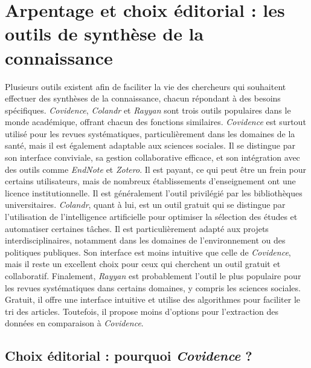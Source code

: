 \documentclass[
  letterpaper,
  DIV=11,
  numbers=noendperiod,
  oneside]{scrreprt}
\begin{document}
\hypertarget{arpentage-et-choix-uxe9ditorial-les-outils-de-synthuxe8se-de-la-connaissance}{%
\section{Arpentage et choix éditorial : les outils de synthèse de la
connaissance}\label{arpentage-et-choix-uxe9ditorial-les-outils-de-synthuxe8se-de-la-connaissance}}

Plusieurs outils existent afin de faciliter la vie des chercheurs qui
souhaitent effectuer des synthèses de la connaissance, chacun répondant
à des besoins spécifiques. \emph{Covidence}, \emph{Colandr} et
\emph{Rayyan} sont trois outils populaires dans le monde académique,
offrant chacun des fonctions similaires. \emph{Covidence} est surtout
utilisé pour les revues systématiques, particulièrement dans les
domaines de la santé, mais il est également adaptable aux sciences
sociales. Il se distingue par son interface conviviale, sa gestion
collaborative efficace, et son intégration avec des outils comme
\emph{EndNote} et \emph{Zotero}. Il est payant, ce qui peut être un
frein pour certains utilisateurs, mais de nombreux établissements
d'enseignement ont une licence institutionnelle. Il est généralement
l'outil privilégié par les bibliothèques universitaires. \emph{Colandr},
quant à lui, est un outil gratuit qui se distingue par l'utilisation de
l'intelligence artificielle pour optimiser la sélection des études et
automatiser certaines tâches. Il est particulièrement adapté aux projets
interdisciplinaires, notamment dans les domaines de l'environnement ou
des politiques publiques. Son interface est moins intuitive que celle de
\emph{Covidence}, mais il reste un excellent choix pour ceux qui
cherchent un outil gratuit et collaboratif. Finalement, \emph{Rayyan}
est probablement l'outil le plus populaire pour les revues systématiques
dans certains domaines, y compris les sciences sociales. Gratuit, il
offre une interface intuitive et utilise des algorithmes pour faciliter
le tri des articles. Toutefois, il propose moins d'options pour
l'extraction des données en comparaison à \emph{Covidence}.

\hypertarget{choix-uxe9ditorial-pourquoi-covidence}{%
\subsection{\texorpdfstring{Choix éditorial : pourquoi \emph{Covidence}
?}{Choix éditorial : pourquoi Covidence ?}}\label{choix-uxe9ditorial-pourquoi-covidence}}
\end{document}
